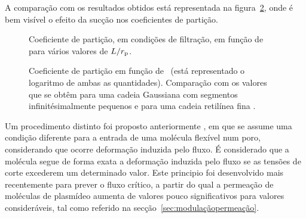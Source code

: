 %
A comparação com os resultados obtidos está representada na figura~\ref{fig:3bart1}, onde é bem visível o efeito da sucção nos coeficientes de partição.
\begin{figure}
	\centering
	\setlength\figureheight{6cm} 
	\setlength\figurewidth{6cm}
	
	\caption[Coeficiente de partição, em função de \numsegmento\, para vários valores de $\contorno/\raioporo$]{Coeficiente de partição, em condições de filtração, em função de \numsegmento\, para vários valores de $\contorno/\raioporo$.}
	\label{fig:3aart1}
\end{figure}       
\begin{figure}
	\centering
	\setlength\figureheight{6cm} 
	\setlength\figurewidth{6cm}
	
	\caption[Coeficiente de partição em função de \lambdah]{Coeficiente de partição em função de \lambdah\ (está representado o logaritmo de ambas as quantidades). Comparação com os valores que se obtêm para uma cadeia Gaussiana com segmentos infinitésimalmente pequenos \cite{casassa} e para uma cadeia retilínea fina \cite{giddings}.}
	\label{fig:3bart1}
\end{figure}

Um procedimento distinto foi proposto anteriormente \cite{daoudi}, em que se assume uma condição diferente para a entrada de uma molécula flexível num poro, considerando que ocorre deformação induzida pelo fluxo.
%
É considerado que a molécula segue de forma exata a deformação induzida pelo fluxo se as tensões de corte excederem um determinado valor.
%
Este principio foi desenvolvido mais recentemente \cite{latu07,latu09,zydneyiso} para prever o fluxo crítico, a partir do qual a permeação de moléculas de plasmídeo aumenta de valores pouco significativos para valores consideráveis, tal como referido na secção~\ref{sec:modulaçãopermeação}.

